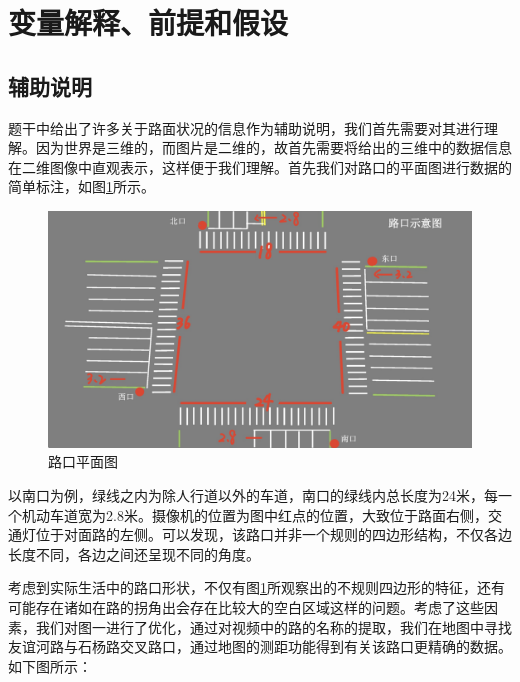 \section{变量解释、前提和假设}\label{sec:hypothesis}

\subsection{辅助说明}\label{subsec:hypothesis-description}

题干中给出了许多关于路面状况的信息作为辅助说明，我们首先需要对其进行理解。因为世界是三维的，而图片是二维的，故首先需要将给出的三维中的数据信息在二维图像中直观表示，这样便于我们理解。首先我们对路口的平面图进行数据的简单标注，如图\ref{fig:p1}所示。

\begin{figure}[h]
    \centering
    \includegraphics[scale=0.1]{figures/路口阴影图.jpg}
    \caption{路口平面图}
    \label{fig:p1}
\end{figure}

以南口为例，绿线之内为除人行道以外的车道，南口的绿线内总长度为24米，每一个机动车道宽为2.8米。摄像机的位置为图中红点的位置，大致位于路面右侧，交通灯位于对面路的左侧。可以发现，该路口并非一个规则的四边形结构，不仅各边长度不同，各边之间还呈现不同的角度。

考虑到实际生活中的路口形状，不仅有图\ref{fig:p1}所观察出的不规则四边形的特征，还有可能存在诸如在路的拐角出会存在比较大的空白区域这样的问题。考虑了这些因素，我们对图一进行了优化，通过对视频中的路的名称的提取，我们在地图中寻找友谊河路与石杨路交叉路口，通过地图的测距功能得到有关该路口更精确的数据。如下图所示：

